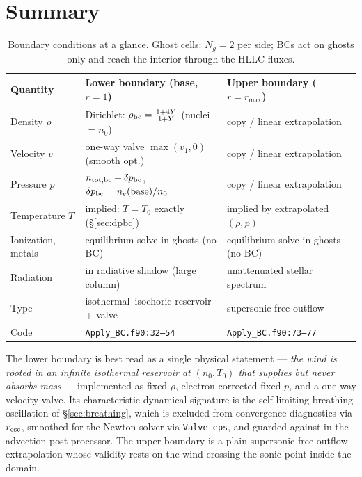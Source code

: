 \documentclass[english,a4paper]{kiseon_memo}
\begin{document}
\section{Summary}

\begin{table}[h]
\centering
\small
\begin{tabular}{@{}llll@{}}
\toprule
Quantity & Lower boundary (base, $r=1$) & Upper boundary ($r=r_{\max}$) \\
\midrule
Density $\rho$       & Dirichlet: $\rho_{\rm bc} = \frac{1+4Y}{1+Y}$ (nuclei $=n_0$) & copy / linear extrapolation \\
Velocity $v$         & one-way valve $\max(v_1,0)$ (smooth opt.) & copy / linear extrapolation \\
Pressure $p$         & $n_{\rm tot,bc}+\delta p_{\rm bc}$, $\delta p_{\rm bc} = n_e(\mbox{base})/n_0$ & copy / linear extrapolation \\
Temperature $T$      & implied: $T = T_0$ exactly (\S\ref{sec:dpbc}) & implied by extrapolated $(\rho,p)$ \\
Ionization, metals   & equilibrium solve in ghosts (no BC) & equilibrium solve in ghosts (no BC) \\
Radiation            & in radiative shadow (large column) & unattenuated stellar spectrum \\
Type                 & isothermal--isochoric reservoir + valve & supersonic free outflow \\
Code                 & \texttt{Apply\_BC.f90:32--54} & \texttt{Apply\_BC.f90:73--77} \\
\bottomrule
\end{tabular}
\caption{Boundary conditions at a glance. Ghost cells: $N_g = 2$ per
side; BCs act on ghosts only and reach the interior through the HLLC
fluxes.}
\label{tab:summary}
\end{table}

The lower boundary is best read as a single physical statement ---
\emph{the wind is rooted in an infinite isothermal reservoir at
$(n_0, T_0)$ that supplies but never absorbs mass} --- implemented as
fixed $\rho$, electron-corrected fixed $p$, and a one-way velocity
valve. Its characteristic dynamical signature is the self-limiting
breathing oscillation of \S\ref{sec:breathing}, which is excluded
from convergence diagnostics via $r_{\rm esc}$, smoothed for the
Newton solver via \texttt{Valve eps}, and guarded against in the
advection post-processor. The upper boundary is a plain supersonic
free-outflow extrapolation whose validity rests on the wind crossing
the sonic point inside the domain.
\end{document}
